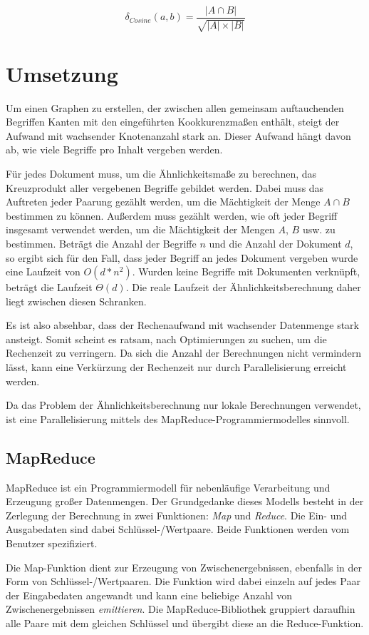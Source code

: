 \[
\delta_{Cosine}(a, b) = \frac{|A \cap B|}{\sqrt{|A| \times |B|}}
\]

\section{Umsetzung}

Um einen Graphen zu erstellen, der zwischen allen gemeinsam auftauchenden Begriffen Kanten mit den eingeführten Kookkurenzmaßen enthält, steigt der Aufwand mit wachsender Knotenanzahl stark an. Dieser Aufwand hängt davon ab, wie viele Begriffe pro Inhalt vergeben werden.

Für jedes Dokument muss, um die Ähnlichkeitsmaße zu berechnen, das Kreuzprodukt aller vergebenen Begriffe gebildet werden. Dabei muss das Auftreten jeder Paarung gezählt werden, um die Mächtigkeit der Menge \(A \cap B\) bestimmen zu können. Außerdem muss gezählt werden, wie oft jeder Begriff insgesamt verwendet werden, um die Mächtigkeit der Mengen \(A\), \(B\) usw. zu bestimmen. Beträgt die Anzahl der Begriffe \(n\) und die Anzahl der Dokument \(d\), so ergibt sich für den Fall, dass jeder Begriff an jedes Dokument vergeben wurde eine Laufzeit von \(O(d*n^2)\). Wurden keine Begriffe mit Dokumenten verknüpft, beträgt die Laufzeit \(\Theta(d)\). Die reale Laufzeit der Ähnlichkeitsberechnung daher liegt zwischen diesen Schranken.

Es ist also absehbar, dass der Rechenaufwand mit wachsender Datenmenge stark ansteigt. Somit scheint es ratsam, nach Optimierungen zu suchen, um die Rechenzeit zu verringern. Da sich die Anzahl der Berechnungen nicht vermindern lässt, kann eine Verkürzung der Rechenzeit nur durch Parallelisierung erreicht werden.

Da das Problem der Ähnlichkeitsberechnung nur lokale Berechnungen verwendet, ist eine Parallelisierung mittels des MapReduce-Programmiermodelles sinnvoll.

\subsection{MapReduce}

MapReduce \cite{dg2004} ist ein Programmiermodell für nebenläufige Verarbeitung und Erzeugung großer Datenmengen. Der Grundgedanke dieses Modells besteht in der Zerlegung der Berechnung in zwei Funktionen: \emph{Map} und \emph{Reduce}. Die Ein- und Ausgabedaten sind dabei Schlüssel-/Wertpaare. Beide Funktionen werden vom Benutzer spezifiziert.

Die Map-Funktion dient zur Erzeugung von Zwischenergebnissen, ebenfalls in der Form von Schlüssel-/Wertpaaren. Die Funktion wird dabei einzeln auf jedes Paar der Eingabedaten angewandt und kann eine beliebige Anzahl von Zwischenergebnissen \emph{emittieren}. Die MapReduce-Bibliothek gruppiert daraufhin alle Paare mit dem gleichen Schlüssel und übergibt diese an die Reduce-Funktion.

